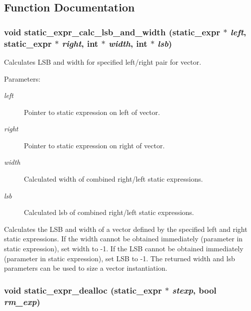 \subsection{Function Documentation}
\subsubsection{\setlength{\rightskip}{0pt plus 5cm}void static\_\-expr\_\-calc\_\-lsb\_\-and\_\-width ({\bf static\_\-expr} $\ast$ {\em left}, {\bf static\_\-expr} $\ast$ {\em right}, int $\ast$ {\em width}, int $\ast$ {\em lsb})}\label{static_8c_a2}


Calculates LSB and width for specified left/right pair for vector.

\begin{Desc}
\item[Parameters: ]\par
\begin{description}
\item[{\em 
left}]Pointer to static expression on left of vector. \item[{\em 
right}]Pointer to static expression on right of vector. \item[{\em 
width}]Calculated width of combined right/left static expressions. \item[{\em 
lsb}]Calculated lsb of combined right/left static expressions.\end{description}
\end{Desc}
Calculates the LSB and width of a vector defined by the specified left and right static expressions. If the width cannot be obtained immediately (parameter in static expression), set width to -1. If the LSB cannot be obtained immediately (parameter in static expression), set LSB to -1. The returned width and lsb parameters can be used to size a vector instantiation. 
\subsubsection{\setlength{\rightskip}{0pt plus 5cm}void static\_\-expr\_\-dealloc ({\bf static\_\-expr} $\ast$ {\em stexp}, {\bf bool} {\em rm\_\-exp})}\label{static_8c_a3}


